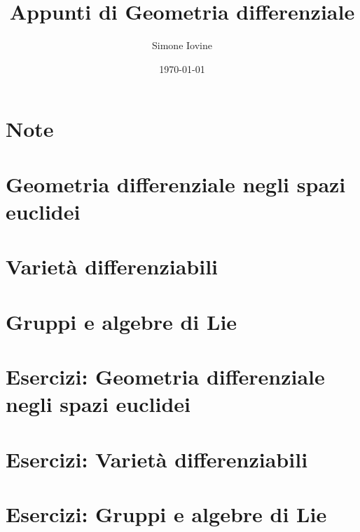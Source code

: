 \documentclass[12pt]{report}
\title{\textbf{Appunti di Geometria differenziale}}
\author{Simone Iovine}
\date{\today}
\makeatletter
\renewcommand{\@chapapp}{Capitolo}
\makeatother
\begin{document}
\maketitle

%


%

\chapter*{Note}


%

\newpage

%


%

\tableofcontents

%

\newpage

%


%

\chapter{Geometria differenziale negli spazi euclidei}


%

\chapter{Varietà differenziabili}


%

\chapter{Gruppi e algebre di Lie}


%

\appendix

\makeatletter
\renewcommand{\@chapapp}{Esercizi}
\makeatother

\chapter{Esercizi: Geometria differenziale negli spazi euclidei}


%


\chapter{Esercizi: Varietà differenziabili}


%


\chapter{Esercizi: Gruppi e algebre di Lie}


%

\end{document}
